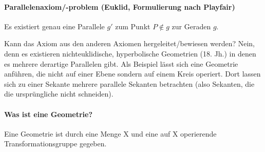 \documentclass[12pt,a4paper,parskip=half-,DIV=15]{scrartcl}
\begin{document}
\paragraph{Parallelenaxiom/-problem (Euklid, Formulierung nach Playfair)} Es existiert genau eine Parallele $ g' $ zum Punkt $ P \notin g $ zur Geraden $ g $.

Kann das Axiom aus den anderen Axiomen hergeleitet/bewiesen werden? Nein, denn es existieren nichteuklidische, hyperbolische Geometrien (18. Jh.) in denen es mehrere derartige Parallelen gibt. Als Beispiel lässt sich eine Geometrie anführen, die nicht auf einer Ebene sondern auf einem Kreis operiert. Dort lassen sich zu einer Sekante mehrere parallele Sekanten betrachten (also Sekanten, die die ursprüngliche nicht schneiden).


\paragraph{Was ist eine Geometrie?} Eine Geometrie ist durch eine Menge X und eine auf X operierende Transformationsgruppe gegeben.
\end{document}
